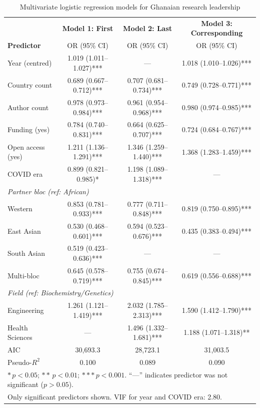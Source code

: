 \documentclass[12pt, a4paper]{article}
\begin{document}
\begin{table}[H]
\centering
\caption{Multivariate logistic regression models for Ghanaian research leadership}
\label{tab:regression}
\small
\begin{tabular}{l c c c}
\toprule
 & \textbf{Model 1: First} & \textbf{Model 2: Last} & \textbf{Model 3: Corresponding} \\
\textbf{Predictor} & OR (95\% CI) & OR (95\% CI) & OR (95\% CI) \\
\midrule
Year (centred) & 1.019 (1.011--1.027)*** & --- & 1.018 (1.010--1.026)*** \\
Country count & 0.689 (0.667--0.712)*** & 0.707 (0.681--0.734)*** & 0.749 (0.728--0.771)*** \\
Author count & 0.978 (0.973--0.984)*** & 0.961 (0.954--0.968)*** & 0.980 (0.974--0.985)*** \\
Funding (yes) & 0.784 (0.740--0.831)*** & 0.664 (0.625--0.707)*** & 0.724 (0.684--0.767)*** \\
Open access (yes) & 1.211 (1.136--1.291)*** & 1.346 (1.259--1.440)*** & 1.368 (1.283--1.459)*** \\
COVID era & 0.899 (0.821--0.985)* & 1.198 (1.089--1.318)*** & --- \\
\midrule
\multicolumn{4}{l}{\textit{Partner bloc (ref: African)}} \\
\quad Western & 0.853 (0.781--0.933)*** & 0.777 (0.711--0.848)*** & 0.819 (0.750--0.895)*** \\
\quad East Asian & 0.530 (0.468--0.601)*** & 0.594 (0.523--0.676)*** & 0.435 (0.383--0.494)*** \\
\quad South Asian & 0.519 (0.423--0.636)*** & --- & --- \\
\quad Multi-bloc & 0.645 (0.578--0.719)*** & 0.755 (0.674--0.845)*** & 0.619 (0.556--0.688)*** \\
\midrule
\multicolumn{4}{l}{\textit{Field (ref: Biochemistry/Genetics)}} \\
\quad Engineering & 1.261 (1.121--1.419)*** & 2.032 (1.785--2.313)*** & 1.590 (1.412--1.790)*** \\
\quad Health Sciences & --- & 1.496 (1.332--1.681)*** & 1.188 (1.071--1.318)** \\
\midrule
AIC & 30{,}693.3 & 28{,}723.1 & 31{,}003.5 \\
Pseudo-$R^2$ & 0.100 & 0.089 & 0.090 \\
\bottomrule
\multicolumn{4}{l}{\footnotesize $*\,p < 0.05$;\;\; $**\,p < 0.01$;\;\; $***\,p < 0.001$. ``---'' indicates predictor was not significant ($p > 0.05$).} \\
\multicolumn{4}{l}{\footnotesize Only significant predictors shown. VIF for year and COVID era: 2.80.} \\
\end{tabular}
\end{table}
\end{document}
